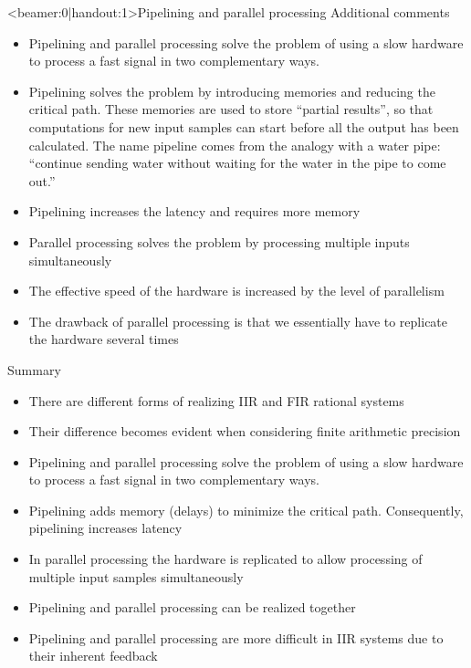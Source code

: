 \documentclass[10pt, handout]{beamer}
\begin{document}
\begin{frame}<beamer:0|handout:1>{Pipelining and parallel processing}
Additional comments

\begin{itemize}
	\item Pipelining and parallel processing solve the problem of using a slow hardware to process a fast signal in two complementary ways. 
	\item Pipelining solves the problem  by introducing memories and reducing the critical path. These memories are used to store ``partial results'', so that computations for new input samples can start before all the output has been calculated. The name pipeline comes from the analogy with a water pipe: ``continue sending water without waiting for the water in the pipe to come out.''
	\item Pipelining increases the latency and requires more memory
	\item Parallel processing solves the problem by processing multiple inputs simultaneously
	\item The effective speed of the hardware is increased by the level of parallelism
	\item The drawback of parallel processing is that we essentially have to replicate the hardware several times
\end{itemize}
\end{frame}


%
\begin{frame}{Summary}
\begin{itemize}
	\item There are different forms of realizing IIR and FIR rational systems
	\item Their difference becomes evident when considering finite arithmetic precision
	\item Pipelining and parallel processing solve the problem of using a slow hardware to process a fast signal in two complementary ways. 
	\item Pipelining adds memory (delays) to minimize the critical path. Consequently, pipelining increases latency
	\item In parallel processing the hardware is replicated to allow processing of multiple input samples simultaneously
	\item Pipelining and parallel processing can be realized together
	\item Pipelining and parallel processing are more difficult in IIR systems due to their inherent feedback
\end{itemize}
\end{frame}
\end{document}
